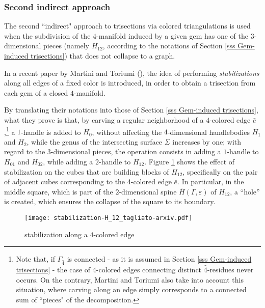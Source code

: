 \documentclass[12pt,a4paper]{article}
\newcommand{\G}{\Gamma}
\begin{document}
\bigskip

\subsubsection{Second indirect approach}  \par \noindent

The second ``indirect" approach to trisections via colored triangulations is used when the subdivision of the $4$-manifold induced by a given gem has one of the 3-dimensional pieces (namely $H_{12}$, according to the notations of Section \ref{sss Gem-induced trisections}) that does not collapse to a graph.

\medskip 
In a recent paper by Martini and Toriumi (\cite{Martini-Toriumi}), the idea of performing {\it stabilizations} along all edges of a fixed color is introduced, in order to obtain a trisection from each gem of a closed $4$-manifold.   

By translating their notations into those of Section \ref{sss Gem-induced trisections}, what they prove is that, by carving a regular neighborhood of a $4$-colored edge $\bar e$,\footnote{Note that, if $\Gamma_{\hat 4}$ is connected - as it is assumed in Section \ref{sss Gem-induced trisections} - the case of $4$-colored edges connecting distinct $\hat 4$-residues never occurs. On the contrary, Martini and Toriumi also take into account this situation, where carving along an edge simply corresponds to a connected sum of ``pieces" of the decomposition.} a $1$-handle is added to $H_0$, without affecting the $4$-dimensional handlebodies $H_1$ and $H_2$,  while the genus of the intersecting surface $\Sigma$ increases by one; with regard to the $3$-dimensional pieces, the operation consists in adding a $1$-handle to $H_{01}$ and $H_{02}$,  
while adding a $2$-handle to $H_{12}$.  
Figure \ref{fig:carving_edge} shows the effect of stabilization on the cubes that are building blocks of $H_{12}$, specifically on the pair of adjacent cubes corresponding to the 4-colored edge $\bar e$. In particular, in the middle square, which is part of the $2$-dimensional spine $\overline H(\G,\varepsilon)$ of $H_{12}$, a “hole” is created, which ensures the collapse of the square to its boundary.

 \begin{figure}   [h!]
     \centering
     \texttt{[image: stabilization-H\_12\_tagliato-arxiv.pdf]}
     \caption{stabilization along a $4$-colored edge}
     \label{fig:carving_edge}
 \end{figure}
\end{document}
